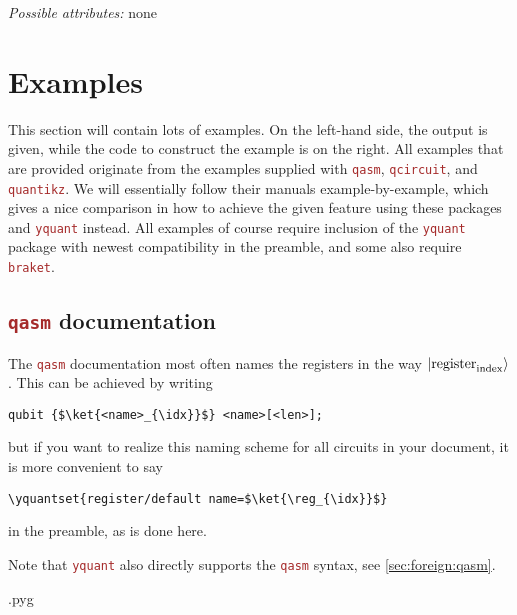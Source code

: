 \documentclass{scrartcl}
\makeatletter
\newenvironment{codeexample}{%
   \VerbatimEnvironment%
   \let\FVB@VerbatimOut\minted@FVB@VerbatimOut
   \let\FVE@VerbatimOut\minted@FVE@VerbatimOut
   \minted@configlang{tex}%
   \minted@fvset
   \begin{VerbatimOut}[codes={\catcode`\^^I=12},firstline,lastline]{\minted@jobname.pyg}%
}{
   \end{VerbatimOut}%
   \minted@langlinenoson%
   \savebox\codeexamplebox{ \minted@jobname.pyg}%
   \ifdim\wd\codeexamplebox>\dimexpr.5\linewidth-3mm\relax%
      \wd\codeexamplebox=.5\linewidth%
   \else%
      \wd\codeexamplebox=\dimexpr\wd\codeexamplebox+3mm\relax%
   \fi%
   \noindent\begin{minipage}{\wd\codeexamplebox}%
      \centering%
      \usebox\codeexamplebox%
   \end{minipage}%
   \begin{minipage}{\dimexpr\linewidth-\wd\codeexamplebox\relax}%
      \minted@pygmentize{\minted@lang}%
   \end{minipage}%
   \minted@langlinenosoff%
   \par%
}
\def\pkg#1{\textcolor{brown}{\texttt{#1}}}
\def\Yquant{\pkg{yquant}}
\newcommand*{\the@orig@section}{}
\let\the@orig@section=\section
\renewcommand*{\section}{%
   \clearpage%
   \the@orig@section%
}
\makeatother
\begin{document}
         \emph{Possible attributes:} none


   \section{Examples}\label{sec:examples}
      This section will contain lots of examples.
      On the left\hyp hand side, the output is given, while the code to construct the example is on the right.
      All examples that are provided originate from the examples supplied with \pkg{qasm}, \pkg{qcircuit}, and \pkg{quantikz}.
      We will essentially follow their manuals example\hyp by\hyp example, which gives a nice comparison in how to achieve the given feature using these packages and \Yquant{} instead.
      All examples of course require inclusion of the \Yquant{} package with newest compatibility in the preamble, and some also require \pkg{braket}.

      \subsection{\pkg{qasm} documentation}
      \begingroup%
         The \pkg{qasm} documentation most often names the registers in the way $\ket{\mathrm{register}_{\mathrm{index}}}$.
         This can be achieved by writing
         \begin{verbatim}
qubit {$\ket{<name>_{\idx}}$} <name>[<len>];
         \end{verbatim}
         but if you want to realize this naming scheme for all circuits in your document, it is more convenient to say
         \begin{verbatim}
\yquantset{register/default name=$\ket{\reg_{\idx}}$}
         \end{verbatim}
         in the preamble, as is done here.

         Note that \Yquant{} also directly supports the \pkg{qasm} syntax, see \cref{sec:foreign:qasm}.

         \begin{example}
            \begin{codeexample}
            \end{codeexample}
         \end{example}
\end{document}
